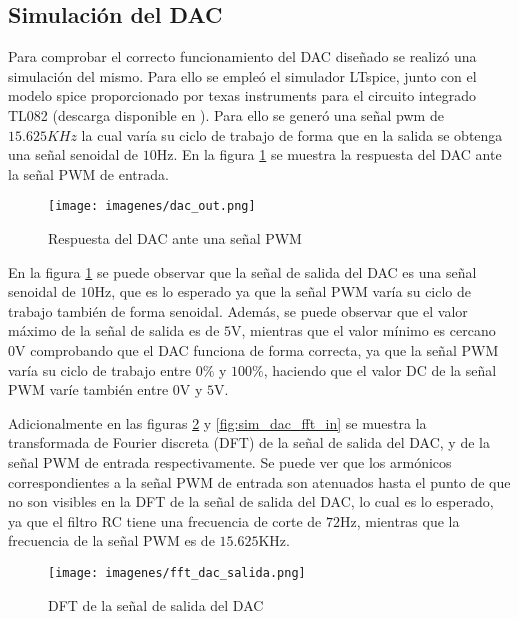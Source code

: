     \subsection{Simulación del DAC}

    Para comprobar el correcto funcionamiento del DAC diseñado se realizó una
    simulación del mismo. Para ello se empleó el simulador LTspice, junto con
    el modelo spice proporcionado por texas instruments para el circuito integrado
    TL082 (descarga disponible en \cite{noauthor_tl082_nodate}). Para ello se 
    generó una señal pwm de $15.625KHz$ la cual varía su ciclo de trabajo 
    de forma que en la salida se obtenga una señal senoidal de $10\text{Hz}$. 
    En la figura
    \ref{fig:sim_dac} se muestra la respuesta del DAC ante la señal PWM de entrada.

    \begin{figure}[H]
        \centering
        \texttt{[image: imagenes/dac\_out.png]}
        \caption{Respuesta del DAC ante una señal PWM}
        \label{fig:sim_dac}
    \end{figure}

    En la figura \ref{fig:sim_dac} se puede observar que la señal de salida
    del DAC es una señal senoidal de $10\text{Hz}$, que es lo esperado ya 
    que la señal PWM varía su ciclo de trabajo también de forma senoidal.
    Además, se puede observar que el valor máximo de la señal de salida es
    de $5\text{V}$, mientras que el valor mínimo es cercano $0\text{V}$
    comprobando que el DAC funciona de forma correcta, ya que la señal PWM
    varía su ciclo de trabajo entre $0\%$ y $100\%$, haciendo que el valor 
    DC de la señal PWM varíe también entre $0\text{V}$ y $5\text{V}$.

    Adicionalmente en las figuras \ref{fig:sim_dac_fft} y \ref{fig:sim_dac_fft_in}
    se muestra la transformada de Fourier discreta (DFT) de la señal de salida
    del DAC, y de la señal PWM de entrada respectivamente. Se puede ver 
    que los armónicos correspondientes a la señal PWM de entrada son atenuados
    hasta el punto de que no son visibles en la DFT de la señal de salida del
    DAC, lo cual es lo esperado, ya que el filtro RC tiene una frecuencia de corte
    de $72\text{Hz}$, mientras que la frecuencia de la señal PWM es de 
    $15.625\text{KHz}$.

    \begin{figure}[H]
        \centering
        \texttt{[image: imagenes/fft\_dac\_salida.png]}
        \caption{DFT de la señal de salida del DAC}
        \label{fig:sim_dac_fft}
    \end{figure}

